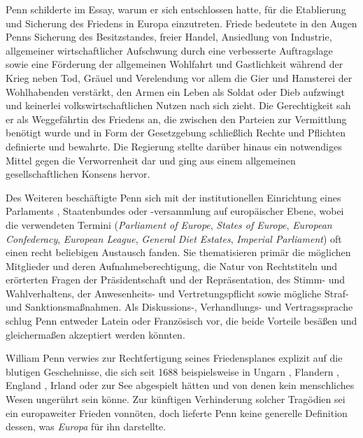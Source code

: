 Penn schilderte im Essay, warum er sich entschlossen hatte, für die
Etablierung und Sicherung des Friedens  in Europa
 einzutreten. Friede bedeutete in den Augen Penns Sicherung
des Besitzstandes, freier Handel, Ansiedlung von Industrie, allgemeiner
wirtschaftlicher Aufschwung durch eine verbesserte Auftragslage sowie eine
Förderung der allgemeinen Wohlfahrt  und Gastlichkeit während
der Krieg  neben Tod, Gräuel und Verelendung vor allem die Gier
 und Hamsterei der Wohlhabenden verstärkt, den Armen
 ein Leben als Soldat  oder Dieb
 aufzwingt und keinerlei volkswirtschaftlichen
 Nutzen nach sich zieht. Die Gerechtigkeit
 sah er als Weggefährtin des Friedens an, die zwischen den
Parteien zur Vermittlung benötigt wurde und in Form der Gesetzgebung
 schließlich Rechte und Pflichten definierte und bewahrte.
Die Regierung  stellte darüber hinaus ein notwendiges Mittel
gegen die Verworrenheit dar und ging aus einem allgemeinen gesellschaftlichen
Konsens hervor.

\medskip

Des Weiteren beschäftigte Penn sich mit der institutionellen Einrichtung eines
Parlaments , Staatenbundes  oder
-versammlung auf europäischer Ebene, wobei die verwendeten Termini
(\textit{Parliament of Europe}, \textit{States of Europe}, \textit{European
Confederacy}, \textit{European League}, \textit{General Diet Estates},
\textit{Imperial Parliament}) oft einen recht beliebigen Austausch fanden. Sie
thematisieren primär die möglichen Mitglieder und deren Aufnahmeberechtigung,
die Natur von Rechtstiteln und erörterten Fragen der Präsidentschaft und der
Repräsentation, des Stimm- und Wahlverhaltens, der Anwesenheits- und
Vertretungspflicht sowie mögliche Straf- und Sanktionsmaßnahmen. Als
Diskussions-, Verhandlungs- und Vertragssprache schlug Penn entweder Latein
 oder Französisch  vor, die
beide Vorteile besäßen und gleichermaßen akzeptiert werden könnten.

\medskip

William Penn verwies zur Rechtfertigung seines Friedensplanes
 explizit auf die blutigen Geschehnisse, die sich seit 1688
beispielsweise in Ungarn , Flandern ,
England , Irland  oder zur See
abgespielt hätten und von denen kein menschliches Wesen ungerührt sein könne.
Zur künftigen Verhinderung solcher Tragödien sei ein europaweiter Frieden
vonnöten, doch lieferte Penn keine generelle Definition dessen, was
\textit{Europa} für ihn darstellte.

